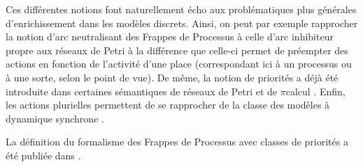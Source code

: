 Ces différentes notions font naturellement écho aux problématiques plus générales d'enrichissement
dans les modèles discrets.
Ainsi, on peut par exemple rapprocher la notion d'arc neutralisant des Frappes de Processus
à celle d'arc inhibiteur propre aux réseaux de Petri \cite{Busi02}
à la différence que celle-ci permet de préempter des actions en fonction de l'activité
d'une place (correspondant ici à un processus ou à une sorte, selon le point de vue).
De même, la notion de priorités a déjà été introduite dans certaines sémantiques de réseaux
de Petri \cite{Marsan87} et de $\pi$\nbd calcul \cite{jlnu2010}.
Enfin, les actions plurielles permettent de se rapprocher de la classe des modèles
à dynamique synchrone .

La définition du formalisme des Frappes de Processus avec classes de priorités
a été publiée dans \cite{FPMR13-CS2Bio}.








